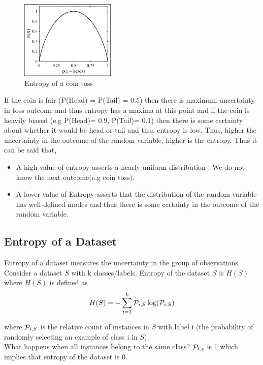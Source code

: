 \begin{figure}[H]
  \centering
  \includegraphics[width=0.4\textwidth]{images/05_11.png}
  \caption{Entropy of a coin toss}
\end{figure}

If the coin is fair (P(Head) = P(Tail) = 0.5) then there is maximum uncertainty in  toss outcome and thus entropy has a maxima at this point and if the coin is heavily biased (e.g P(Head)= 0.9, P(Tail)= 0.1) then there is some certainty about whether it would be head or tail and thus entropy is low. Thus, higher the uncertainty in the outcome of the random variable, higher is the entropy.
Thus it can be said that,
\begin{itemize}
  \item A high value of entropy asserts a nearly uniform distribution . We do not know the next outcome(e.g coin toss).
  \item A lower value of Entropy asserts that the distribution of the random variable has well-defined modes and thus there is some certainty in the outcome of the random variable.
\end{itemize}

\subsection{Entropy of a Dataset}

Entropy of a dataset measures the uncertainty in the group of observations. Consider a dataset $S$ with k classes/labels. Entropy of the dataset $S$ is $H(S)$ where $H(S)$ is defined as
$$
  H(S) =  -\sum_{i=1}^{k} \mathcal{P}_{i,S}\log (\mathcal{P}_{i,S})
$$

where $\mathcal{P}_{i,S}$ is the relative count of instances in $S$ with label i (the probability of randomly selecting an example of class i in $S$).\\
What happens when all instances belong to the same class? $\mathcal{P}_{i,s}$ is 1 which implies that entropy of the dataset is 0. \\


